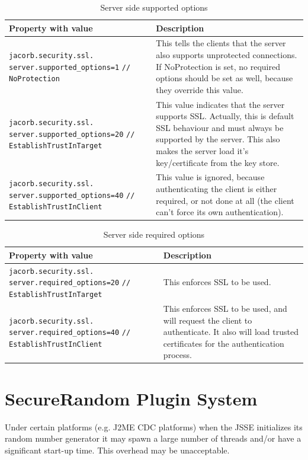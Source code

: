\begin{table}
\caption{Server side supported options}
\begin{tabular}{|p{7cm}|p{7cm}|}
\hline
\textbf{Property with value}& \textbf{Description}\\
\hline
\verb"jacorb.security.ssl."
\verb"server.supported_options=1"
\verb"// NoProtection"& This tells the clients that the server also
supports unprotected connections. If NoProtection is set, no required
options should be set as well, because they override this value. \\
\hline
\verb"jacorb.security.ssl."
\verb"server.supported_options=20"
\verb"// EstablishTrustInTarget"& This value indicates that the server
supports SSL. Actually, this is default SSL behaviour and must always
be supported by the server. This also makes the server load it's
key/certificate from the key store.\\ 
\hline
\verb"jacorb.security.ssl."
\verb"server.supported_options=40"
\verb"// EstablishTrustInClient"&  This value is ignored, because
authenticating the client is either required, or not done at all (the
client can't force its own authentication).\\
\hline
\end{tabular}
\end{table}
\begin{table}

\caption{Server side required options}
\begin{tabular}{|p{7cm}|p{7cm}|}
\hline
\textbf{Property with value}& \textbf{Description}\\
\hline
\verb"jacorb.security.ssl."
\verb"server.required_options=20"
\verb"// EstablishTrustInTarget"& This enforces SSL to be used.\\ 
\hline
\verb"jacorb.security.ssl."
\verb"server.required_options=40"
\verb"// EstablishTrustInClient"&  This enforces SSL to be used, and
will request the client to authenticate. It also will load trusted
certificates for the authentication process.\\ 
\hline
\end{tabular}
\end{table}

\section{SecureRandom Plugin System}
Under certain platforms (e.g. J2ME CDC platforms) when the JSSE
initializes its random number generator it may spawn a large number
of threads and/or have a significant start-up time. This overhead may
be unacceptable.

